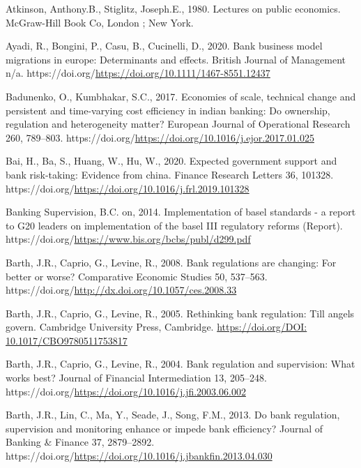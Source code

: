 \documentclass[
  12pt,
  a4paper,
  DIV=11,
  numbers=noendperiod]{scrreprt}
\newlength{\cslhangindent}
\newenvironment{CSLReferences}[2] %
 {\begin{list}{}{%
  \setlength{\itemindent}{0pt}
  \setlength{\leftmargin}{0pt}
  \setlength{\parsep}{0pt}
  \ifodd #1
   \setlength{\leftmargin}{\cslhangindent}
   \setlength{\itemindent}{-1\cslhangindent}
  \fi
  \setlength{\itemsep}{#2\baselineskip}}}
 {\end{list}}
\begin{document}
\begin{CSLReferences}{1}{0}
Atkinson, Anthony.B., Stiglitz, Joseph.E., 1980. Lectures on public
economics. McGraw-Hill Book Co, London ; New York.

Ayadi, R., Bongini, P., Casu, B., Cucinelli, D., 2020. Bank business
model migrations in europe: Determinants and effects. British Journal of
Management n/a.
https://doi.org/\url{https://doi.org/10.1111/1467-8551.12437}

Badunenko, O., Kumbhakar, S.C., 2017. Economies of scale, technical
change and persistent and time-varying cost efficiency in indian
banking: Do ownership, regulation and heterogeneity matter? European
Journal of Operational Research 260, 789--803.
https://doi.org/\url{https://doi.org/10.1016/j.ejor.2017.01.025}

Bai, H., Ba, S., Huang, W., Hu, W., 2020. Expected government support
and bank risk-taking: Evidence from china. Finance Research Letters 36,
101328. https://doi.org/\url{https://doi.org/10.1016/j.frl.2019.101328}

Banking Supervision, B.C. on, 2014. Implementation of basel standards -
a report to G20 leaders on implementation of the basel III regulatory
reforms (Report).
https://doi.org/\url{https://www.bis.org/bcbs/publ/d299.pdf}

Barth, J.R., Caprio, G., Levine, R., 2008. Bank regulations are
changing: For better or worse? Comparative Economic Studies 50,
537--563. https://doi.org/\url{http://dx.doi.org/10.1057/ces.2008.33}

Barth, J.R., Caprio, G., Levine, R., 2005. Rethinking bank regulation:
Till angels govern. Cambridge University Press, Cambridge.
\href{https://doi.org/DOI:\%2010.1017/CBO9780511753817}{https://doi.org/DOI:
10.1017/CBO9780511753817}

Barth, J.R., Caprio, G., Levine, R., 2004. Bank regulation and
supervision: What works best? Journal of Financial Intermediation 13,
205--248.
https://doi.org/\url{https://doi.org/10.1016/j.jfi.2003.06.002}

Barth, J.R., Lin, C., Ma, Y., Seade, J., Song, F.M., 2013. Do bank
regulation, supervision and monitoring enhance or impede bank
efficiency? Journal of Banking \& Finance 37, 2879--2892.
https://doi.org/\url{https://doi.org/10.1016/j.jbankfin.2013.04.030}


\end{CSLReferences}
\end{document}
